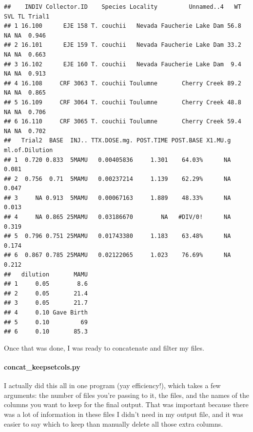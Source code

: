 \documentclass[
]{article}
\begin{document}
\begin{verbatim}
##    INDIV Collector.ID    Species Locality         Unnamed..4   WT SVL TL Trial1
## 1 16.100      EJE 158 T. couchii   Nevada Faucherie Lake Dam 56.8  NA NA  0.946
## 2 16.101      EJE 159 T. couchii   Nevada Faucherie Lake Dam 33.2  NA NA  0.663
## 3 16.102      EJE 160 T. couchii   Nevada Faucherie Lake Dam  9.4  NA NA  0.913
## 4 16.108     CRF 3063 T. couchii Toulumne       Cherry Creek 89.2  NA NA  0.865
## 5 16.109     CRF 3064 T. couchii Toulumne       Cherry Creek 48.8  NA NA  0.706
## 6 16.110     CRF 3065 T. couchii Toulumne       Cherry Creek 59.4  NA NA  0.702
##   Trial2  BASE  INJ.. TTX.DOSE.mg. POST.TIME POST.BASE X1.MU.g ml.of.Dilution
## 1  0.720 0.833  5MAMU   0.00405836     1.301    64.03%      NA          0.081
## 2  0.756  0.71  5MAMU   0.00237214     1.139    62.29%      NA          0.047
## 3     NA 0.913  5MAMU   0.00067163     1.889    48.33%      NA          0.013
## 4     NA 0.865 25MAMU   0.03186670        NA   #DIV/0!      NA          0.319
## 5  0.796 0.751 25MAMU   0.01743380     1.183    63.48%      NA          0.174
## 6  0.867 0.785 25MAMU   0.02122065     1.023    76.69%      NA          0.212
##   dilution       MAMU
## 1     0.05        8.6
## 2     0.05       21.4
## 3     0.05       21.7
## 4     0.10 Gave Birth
## 5     0.10         69
## 6     0.10       85.3
\end{verbatim}

Once that was done, I was ready to concatenate and filter my files.

\hypertarget{concat_keepsetcols.py}{%
\paragraph{concat\_keepsetcols.py}\label{concat_keepsetcols.py}}

I actually did this all in one program (yay efficiency!), which takes a
few arguments: the number of files you're passing to it, the files, and
the names of the columns you want to keep for the final output. That was
important because there was a lot of information in these files I didn't
need in my output file, and it was easier to say which to keep than
manually delete all those extra columns.
\end{document}
